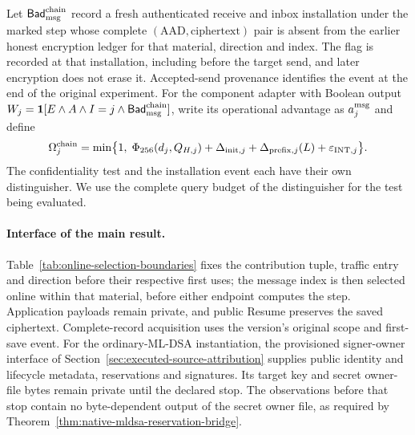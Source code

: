 \documentclass[pdflatex]{sn-jnl}
\theoremstyle{thmstyleone}
\theoremstyle{thmstylethree}
\theoremstyle{thmstyletwo}
\begin{document}
Let $\mathsf{Bad}_{\rm msg}^{\rm chain}$ record a fresh authenticated
receive and inbox installation under the marked step whose complete
$(\mathrm{AAD},\mathrm{ciphertext})$ pair is absent from the earlier
honest encryption ledger for that material, direction and index.
The flag is recorded at that installation, including before the target
send, and later encryption does not erase it. Accepted-send provenance
identifies the event at the end of the original experiment. For the
component adapter with Boolean output
$W_j=\mathbf1[E\wedge A\wedge I=j\wedge
\mathsf{Bad}_{\rm msg}^{\rm chain}]$, write its operational advantage
as $a_j^{\rm msg}$ and define
\begin{equation}
 \Omega_j^{\rm chain}=\min\bigl\{1,\;
  \Phi_{256}(d_j,Q_{H,j})+\Delta_{{\rm init},j}
  +\Delta_{{\rm prefix},j}(L)+\varepsilon_{{\rm INT},j}\bigr\}.
 \label{eq:native-chain-integrity-cost}
\end{equation}
The confidentiality test and the installation event each have their
own distinguisher. We use the complete query budget of the
distinguisher for the test being evaluated.

\paragraph{Interface of the main result.}
Table~\ref{tab:online-selection-boundaries} fixes the contribution tuple,
traffic entry and direction before their respective first uses; the
message index is then selected online within that material, before
either endpoint computes the step. Application payloads remain private,
and public Resume preserves the saved ciphertext. Complete-record
acquisition uses the version's original scope and first-save event.
For the ordinary-ML-DSA instantiation, the provisioned signer-owner
interface of Section~\ref{sec:executed-source-attribution} supplies public
identity and lifecycle metadata, reservations and signatures. Its target
key and secret owner-file bytes remain private until the declared stop.
The observations before that stop contain no byte-dependent output of
the secret owner file, as required by
Theorem~\ref{thm:native-mldsa-reservation-bridge}.
\end{document}
